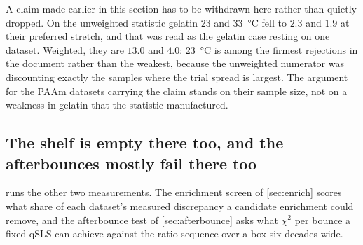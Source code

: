 \documentclass[10pt]{article}
\begin{document}
A claim made earlier in this section has to be withdrawn here rather than quietly dropped. On
the unweighted statistic gelatin \SI{23}{} and \SI{33}{\celsius} fell to $2.3$ and $1.9$ at their
preferred stretch, and that was read as the gelatin case resting on one dataset. Weighted, they
are $13.0$ and $4.0$: \SI{23}{\celsius} is among the firmest rejections in the document rather
than the weakest, because the unweighted numerator was discounting exactly the samples where the
trial spread is largest. The argument for the PAAm datasets carrying the claim stands on their
sample size, not on a weakness in gelatin that the statistic manufactured.

\subsection*{The shelf is empty there too, and the afterbounces mostly fail there too}

 runs the other two measurements. The enrichment screen of \cref{sec:enrich}
scores what share of each dataset's measured discrepancy a candidate enrichment could remove,
and the afterbounce test of \cref{sec:afterbounce} asks what $\chi^2$ per bounce a fixed qSLS
can achieve against the ratio sequence over a box six decades wide.
\end{document}
